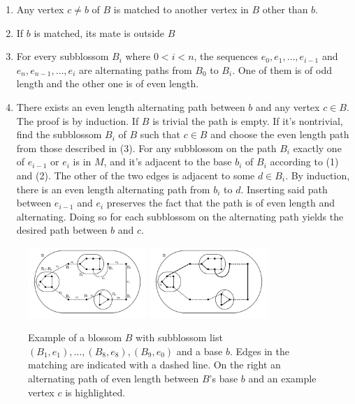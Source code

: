 \begin{enumerate}
    \item Any vertex $c \neq b$ of $B$ is matched to another vertex in $B$ other than $b$.
    \item If $b$ is matched, its mate is outside $B$
    \item For every subblossom $B_i$ where $0 < i < n$, the sequences $e_0, e_1, \dots, e_{i-1}$ and $e_n, e_{n-1}, \dots, e_i$ are alternating paths from $B_0$ to $B_i$. One of them is of odd length and the other one is of even length.
    \item There exists an even length alternating path between $b$ and any vertex $c \in B$. The proof is by induction. If $B$ is trivial the path is empty. If it's nontrivial, find the subblossom $B_i$ of $B$ such that $c \in B$ and choose the even length path from those described in (3). For any subblossom on the path $B_i$ exactly one of $e_{i-1}$ or $e_{i}$ is in $M$, and it's adjacent to the base $b_i$ of $B_i$ according to (1) and (2). The other of the two edges is adjacent to some $d \in B_i$. By induction, there is an even length alternating path from $b_i$ to $d$. Inserting said path between $e_{i-1}$ and $e_i$ preserves the fact that the path is of even length and alternating. Doing so for each subblossom on the alternating path yields the desired path between $b$ and $c$.
\end{enumerate}

\begin{figure}[b]
    \centering
    \includegraphics*[width=0.4\textwidth]{figures/Basic Blossom.png}
    \includegraphics*[width=0.4\textwidth]{figures/Blossom alternating clean.png}
    \caption{Example of a blossom $B$ with subblossom list $(B_1, e_1), \dots, (B_8, e_8), (B_9, e_0)$ and a base $b$. Edges in the matching are indicated with a dashed line. On the right an alternating path of even length between $B$'s base $b$ and an example vertex $c$ is highlighted.}
\end{figure}

